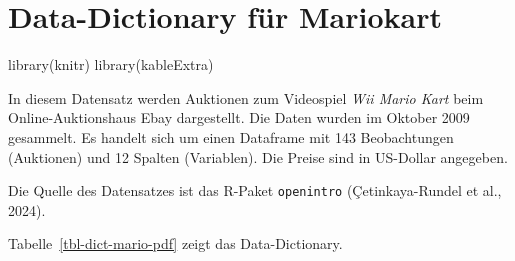 \documentclass[
  letterpaper,
  twoside,
  open=any]{scrbook}
\newenvironment{Shaded}{\begin{snugshade}}{\end{snugshade}}
\newcommand{\FunctionTok}[1]{\textcolor[rgb]{0.28,0.35,0.67}{#1}}
\newcommand{\NormalTok}[1]{\textcolor[rgb]{0.00,0.23,0.31}{#1}}
\theoremstyle{definition}
\theoremstyle{definition}
\theoremstyle{definition}
\theoremstyle{remark}
\begin{document}
\chapter{Data-Dictionary für Mariokart}\label{sec-data-dict}

\begin{Shaded}
\begin{Highlighting}[]
\FunctionTok{library}\NormalTok{(knitr)}
\FunctionTok{library}\NormalTok{(kableExtra)}
\end{Highlighting}
\end{Shaded}

In diesem Datensatz werden Auktionen zum Videospiel \emph{Wii Mario
Kart} beim Online-Auktionshaus Ebay dargestellt. Die Daten wurden im
Oktober 2009 gesammelt. Es handelt sich um einen Dataframe mit 143
Beobachtungen (Auktionen) und 12 Spalten (Variablen). Die Preise sind in
US-Dollar angegeben.

Die Quelle des Datensatzes ist das R-Paket \texttt{openintro}
(Çetinkaya-Rundel et al., 2024).

Tabelle~\ref{tbl-dict-mario-pdf} zeigt das Data-Dictionary.

\begin{table}

\caption{\label{tbl-dict-mario-pdf}Data-Dictionary für Mariokart}


\end{table}%
\end{document}
